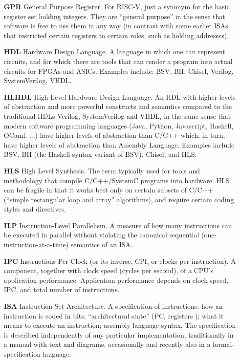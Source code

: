 \begin{itemize}
\item[\bf GPR] General Purpose Register.  For RISC-V, just a synonym
  for the basic register set holding integers.  They are ``general
  purpose'' in the sense that software is free to use them in any way
  (in contrast with some earlier ISAs that restricted certain
  registers to certain roles, such as holding addresses).

\item[\bf HDL] Hardware Design Language.  A language in which one can
  represent circuits, and for which there are tools that can render a
  program into actual circuits for FPGAs and ASICs.  Examples include:
  BSV, BH, Chisel, Verilog, SystemVerilog, VHDL.

\item[\bf HLHDL] High-Level Hardware Design Language.  An HDL with
  higher-levels of abstraction and more powerful constructs and
  semantics compared to the traditional HDLs Verilog, SystemVerilog
  and VHDL, in the same sense that modern software programming
  languages (Java, Python, Javascript, Haskell, OCaml, ...) have
  higher-levels of abstraction than C/C++ which, in turn, have higher
  levels of abstraction than Assembly Language.  Examples include BSV,
  BH (the Haskell-syntax variant of BSV), Chisel, and HLS.

\item[\bf HLS] High Level Synthesis.  The term typically used for
  tools and methodology that compile C/C++/SystemC programs into
  hardware.  HLS can be fragile in that it works best only on certain
  subsets of C/C++ (``simple rectangular loop and array'' algorithms),
  and require certain coding styles and directives.

\item[\bf ILP] Instruction-Level Parallelism.  A measure of how many
  instructions can be executed in parallel without violating the
  canonical sequential (one-instruction-at-a-time) semantics of an
  ISA.

\item[\bf IPC] Instructions Per Clock (or its inverse, CPI, or clocks
  per instruction).  A component, together with clock speed (cycles
  per second), of a CPU's application performance.  Application
  performance depends on clock speed, IPC, and total number of
  instructions.

\item[\bf ISA] Instruction Set Architecture.  A specification of
  instructions: how an instruction is coded in bits; ``architectural
  state'' (PC, registers {\etc}); what it means to execute an
  instruction; assembly language syntax.  The specification is
  described independently of any particular implementation,
  traditionally in a manual with text and diagrams, occasionally and
  recently also in a formal-specification language.


\end{itemize}
